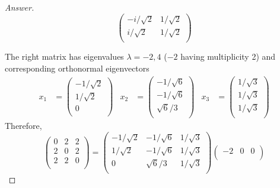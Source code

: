 \documentclass[../psets.tex]{subfiles}
\begin{document}
\begin{enumerate}[label={\textbf{6.\arabic*.}}]
\begin{proof}[Answer]
\begin{equation*}
\begin{pmatrix}
                -i/\sqrt{2} & 1/\sqrt{2}\\
                i/\sqrt{2} & 1/\sqrt{2}\\
            \end{pmatrix}
        \end{equation*}\par
        The right matrix has eigenvalues $\lambda=-2,4$ ($-2$ having multiplicity 2) and corresponding orthonormal eigenvectors
        \begin{align*}
            x_1 &=
            \begin{pmatrix}
                -1/\sqrt{2}\\
                1/\sqrt{2}\\
                0\\
            \end{pmatrix}&
            x_2 &=
            \begin{pmatrix}
                -1/\sqrt{6}\\
                -1/\sqrt{6}\\
                \sqrt{6}/3\\
            \end{pmatrix}&
            x_3 &=
            \begin{pmatrix}
                1/\sqrt{3}\\
                1/\sqrt{3}\\
                1/\sqrt{3}\\
            \end{pmatrix}
        \end{align*}
        Therefore,
        \begin{equation*}
            \begin{pmatrix}
                0 & 2 & 2\\
                2 & 0 & 2\\
                2 & 2 & 0\\
            \end{pmatrix}
            =
            \begin{pmatrix}
                -1/\sqrt{2} & -1/\sqrt{6} & 1/\sqrt{3}\\
                1/\sqrt{2} & -1/\sqrt{6} & 1/\sqrt{3}\\
                0 & \sqrt{6}/3 & 1/\sqrt{3}\\
            \end{pmatrix}
            \begin{pmatrix}
                -2 & 0 & 0\\

\end{pmatrix}
\end{equation*}
\end{proof}
\end{enumerate}
\end{document}
